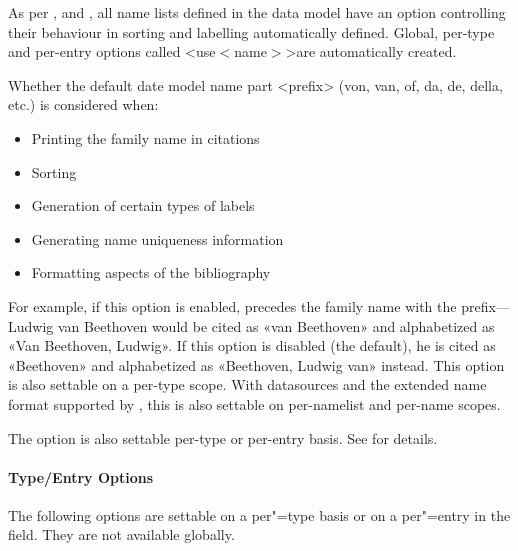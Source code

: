 \documentclass{ltxdockit}[2011/03/25]
\newcommand*{\biber}{\sty{biber}\xspace}
\newcommand*{\biblatex}{\sty{biblatex}\xspace}
\newcommand*{\biblatexml}{\sty{biblatexml}\xspace}
\begin{document}
\begin{optionlist}

As per ,  and , all name lists defined in the data model have an option controlling their behaviour in sorting and labelling automatically 
defined. Global, per-type and per-entry options called <use$<$name$>$>are automatically created. 


Whether the default date model name part <prefix> (von, van, of, da, de, della, etc.) is considered when:

\begin{itemize}
\item Printing the family name in citations
\item Sorting
\item Generation of certain types of labels
\item Generating name uniqueness information
\item Formatting aspects of the bibliography
\end{itemize}
%
For example, if this option is enabled, \biblatex precedes the family name with the prefix---Ludwig van Beethoven would be cited as «van Beethoven» and alphabetized as «Van Beethoven, Ludwig». If this option is disabled (the default), he is cited as «Beethoven» and alphabetized as «Beethoven, Ludwig van» instead.
This option is also settable on a per-type scope. With \biblatexml datasources and the \bibtex extended name format supported by \biber, this is also settable on per-namelist and per-name scopes.


The  option is also settable per-type or per-entry basis. See  for details.

\end{optionlist}

\paragraph{Type/Entry Options}
\label{use:opt:bib:ded}

The following options are settable on a per"=type basis or on a per"=entry in the  field. They are not available globally.
\end{document}
